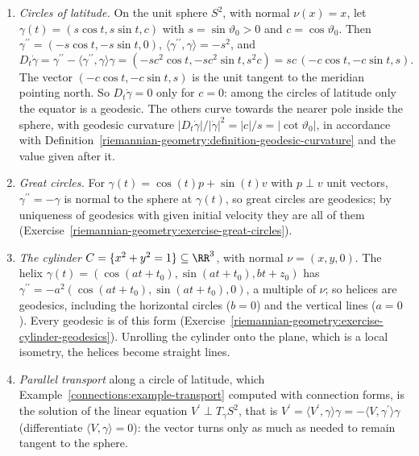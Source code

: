 \begin{example}\label{riemannian-geometry:example-tangential-projection}
\begin{enumerate}
\item \emph{Circles of latitude.} On the unit sphere $S^2$, with normal $\nu(x) = x$, let $\gamma(t) = (s\cos t, s\sin t, c)$ with $s = \sin\vartheta_0 > 0$ and $c = \cos\vartheta_0$. Then $\gamma^{\prime\prime} = (-s\cos t, -s\sin t, 0)$,
$\langle\gamma^{\prime\prime}, \gamma\rangle = -s^2$, and
\[
D_t\dot\gamma = \gamma^{\prime\prime} - \langle\gamma^{\prime\prime}, \gamma\rangle\gamma = (-sc^2\cos t, -sc^2\sin t, s^2c) = sc\,(-c\cos t, -c\sin t, s) .
\]
The vector $(-c\cos t, -c\sin t, s)$ is the unit tangent to the meridian pointing north. So $D_t\dot\gamma = 0$ only for $c = 0$: among the circles of latitude only the equator is a geodesic. The others curve
towards the nearer pole inside the sphere, with geodesic curvature $|D_t\dot\gamma|/|\dot\gamma|^2 = |c|/s = |\cot\vartheta_0|$, in accordance with
Definition~\ref{riemannian-geometry:definition-geodesic-curvature} and the value given after it.
\item \emph{Great circles.} For $\gamma(t) = \cos(t)p + \sin(t)v$ with $p \perp v$ unit vectors, $\gamma^{\prime\prime} = -\gamma$ is normal to the sphere at $\gamma(t)$, so great circles are geodesics; by uniqueness of
geodesics with given initial velocity they are all of them (Exercise~\ref{riemannian-geometry:exercise-great-circles}).
\item \emph{The cylinder} $C = \{x^2 + y^2 = 1\} \subseteq \RR^3$, with normal $\nu = (x, y, 0)$. The helix $\gamma(t) = (\cos(at + t_0), \sin(at + t_0), bt + z_0)$ has $\gamma^{\prime\prime} = -a^2(\cos(at + t_0), \sin(at + t_0), 0)$, a
multiple of $\nu$; so helices are geodesics, including the horizontal circles ($b = 0$) and the vertical lines ($a = 0$). Every geodesic is of this form
(Exercise~\ref{riemannian-geometry:exercise-cylinder-geodesics}). Unrolling the cylinder onto the plane, which is a local isometry, the helices become straight lines.
\item \emph{Parallel transport} along a circle of latitude, which Example~\ref{connections:example-transport} computed with connection forms, is the solution of the linear equation $V^{\prime} \perp T_\gamma S^2$,
that is $V^{\prime} = \langle V^{\prime}, \gamma\rangle\gamma = -\langle V, \gamma^{\prime}\rangle\gamma$ (differentiate $\langle V, \gamma\rangle = 0$): the vector turns only as much as needed to remain tangent to the sphere.
\end{enumerate}
\end{example}

